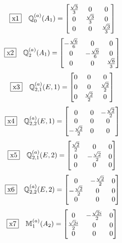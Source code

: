 \documentclass[fleqn,10pt,landscape]{jsarticle}
\begin{document}
\begin{dmath*}
\fbox{x1}\quad \mathbb{Q}_{0}^{(a)}(A_{1})=\begin{bmatrix} \frac{\sqrt{3}}{3} & 0 & 0 \\ 0 & \frac{\sqrt{3}}{3} & 0 \\ 0 & 0 & \frac{\sqrt{3}}{3} \end{bmatrix}
\end{dmath*}
\begin{dmath*}
\fbox{x2}\quad \mathbb{Q}_{2}^{(a)}(A_{1})=\begin{bmatrix} - \frac{\sqrt{6}}{6} & 0 & 0 \\ 0 & - \frac{\sqrt{6}}{6} & 0 \\ 0 & 0 & \frac{\sqrt{6}}{3} \end{bmatrix}
\end{dmath*}
\begin{dmath*}
\fbox{x3}\quad \mathbb{Q}_{2,1}^{(a)}(E,1)=\begin{bmatrix} 0 & 0 & 0 \\ 0 & 0 & \frac{\sqrt{2}}{2} \\ 0 & \frac{\sqrt{2}}{2} & 0 \end{bmatrix}
\end{dmath*}
\begin{dmath*}
\fbox{x4}\quad \mathbb{Q}_{2,2}^{(a)}(E,1)=\begin{bmatrix} 0 & 0 & - \frac{\sqrt{2}}{2} \\ 0 & 0 & 0 \\ - \frac{\sqrt{2}}{2} & 0 & 0 \end{bmatrix}
\end{dmath*}
\begin{dmath*}
\fbox{x5}\quad \mathbb{Q}_{2,1}^{(a)}(E,2)=\begin{bmatrix} \frac{\sqrt{2}}{2} & 0 & 0 \\ 0 & - \frac{\sqrt{2}}{2} & 0 \\ 0 & 0 & 0 \end{bmatrix}
\end{dmath*}
\begin{dmath*}
\fbox{x6}\quad \mathbb{Q}_{2,2}^{(a)}(E,2)=\begin{bmatrix} 0 & - \frac{\sqrt{2}}{2} & 0 \\ - \frac{\sqrt{2}}{2} & 0 & 0 \\ 0 & 0 & 0 \end{bmatrix}
\end{dmath*}
\begin{dmath*}
\fbox{x7}\quad \mathbb{M}_{1}^{(a)}(A_{2})=\begin{bmatrix} 0 & - \frac{\sqrt{2} i}{2} & 0 \\ \frac{\sqrt{2} i}{2} & 0 & 0 \\ 0 & 0 & 0 \end{bmatrix}
\end{dmath*}
\end{document}
